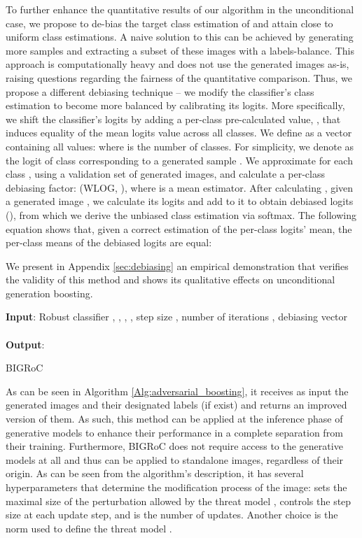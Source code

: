 \documentclass[10pt]{article} \usepackage[accepted]{tmlr}
\begin{document}
To further enhance the quantitative results of our algorithm in the unconditional case, we propose to de-bias the target class estimation of  and attain close to uniform class estimations.
A naive solution to this can be achieved by generating more samples and extracting a subset of these images with a labels-balance.
This approach is computationally heavy and does not use the generated images as-is, raising questions regarding the fairness of the quantitative comparison.
Thus, we propose a different debiasing technique -- we modify the classifier's class estimation to become more balanced by calibrating its logits.
More specifically, we shift the classifier's logits by adding a per-class pre-calculated value, , that induces equality of the mean logits value across all classes.
We define  as a vector containing all  values:
 where  is the number of classes.
For simplicity, we denote  as the logit of class  corresponding to a generated sample .
We approximate  for each class , using a validation set of generated images, and calculate a per-class debiasing factor:  (WLOG, ), where  is a mean estimator.
After calculating , given a generated image , we calculate its logits and add  to it to obtain debiased logits (), from which we derive the unbiased class estimation via softmax.
The following equation shows that, given a correct estimation of the per-class logits' mean, the per-class means of the debiased logits are equal:



\noindent We present in Appendix \ref{sec:debiasing} an empirical demonstration that verifies the validity of this method and shows its qualitative effects on unconditional generation boosting.


\begin{algorithm}[ht]
\SetAlgoLined
\textbf{Input}: Robust classifier , , , , step size , number of iterations , debiasing vector \\
 \\
\textbf{Output}: 
\caption{BIGRoC}
\label{Alg:adversarial_boosting}
\end{algorithm}

As can be seen in Algorithm \ref{Alg:adversarial_boosting}, it receives as input the generated images and their designated labels (if exist) and returns an improved version of them.
As such, this method can be applied at the inference phase of generative models to enhance their performance in a complete separation from their training.
Furthermore, BIGRoC does not require access to the generative models at all and thus can be applied to standalone images, regardless of their origin.
As can be seen from the algorithm's description, it has several hyperparameters that determine the modification process of the image:  sets the maximal size of the perturbation allowed by the threat model ,  controls the step size at each update step, and  is the number of updates. Another choice is the norm used to define the threat model .
\end{document}
